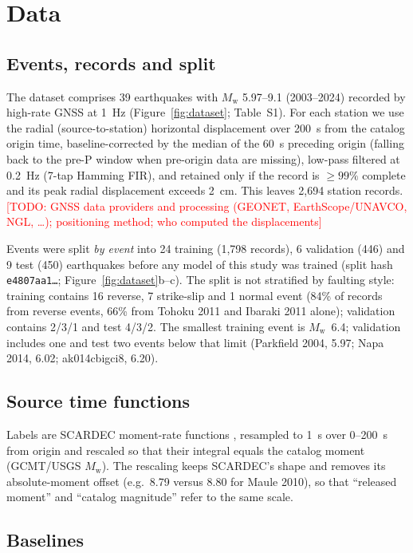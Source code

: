 \documentclass[12pt,letterpaper]{article}
\newcommand{\Mw}{M_{\mathrm{w}}}
\newcommand{\todo}[1]{\textcolor{red}{[TODO: #1]}}
\begin{document}
\section{Data}\label{sec:data}

\subsection{Events, records and split}

The dataset comprises 39 earthquakes with $\Mw$ 5.97--9.1 (2003--2024) recorded by high-rate GNSS at 1~Hz (Figure~\ref{fig:dataset}; Table~S1). For each station we use the radial (source-to-station) horizontal displacement over 200~s from the catalog origin time, baseline-corrected by the median of the 60~s preceding origin (falling back to the pre-P window when pre-origin data are missing), low-pass filtered at 0.2~Hz (7-tap Hamming FIR), and retained only if the record is $\geq99\%$ complete and its peak radial displacement exceeds 2~cm. This leaves 2,694 station records. \todo{GNSS data providers and processing (GEONET, EarthScope/UNAVCO, NGL, \ldots); positioning method; who computed the displacements}

Events were split \emph{by event} into 24 training (1,798 records), 6 validation (446) and 9 test (450) earthquakes before any model of this study was trained (split hash \texttt{e4807aa1\ldots}; Figure~\ref{fig:dataset}b--c). The split is not stratified by faulting style: training contains 16 reverse, 7 strike-slip and 1 normal event (84\% of records from reverse events, 66\% from Tohoku 2011 and Ibaraki 2011 alone); validation contains 2/3/1 and test 4/3/2. The smallest training event is $\Mw$~6.4; validation includes one and test two events below that limit (Parkfield 2004, 5.97; Napa 2014, 6.02; ak014cbigci8, 6.20).

\subsection{Source time functions}

Labels are SCARDEC moment-rate functions \citep{Vallee2011,Vallee2016}, resampled to 1~s over 0--200~s from origin and rescaled so that their integral equals the catalog moment (GCMT/USGS $\Mw$). The rescaling keeps SCARDEC's shape and removes its absolute-moment offset (e.g.\ 8.79 versus 8.80 for Maule 2010), so that ``released moment'' and ``catalog magnitude'' refer to the same scale.

\subsection{Baselines}
\end{document}
